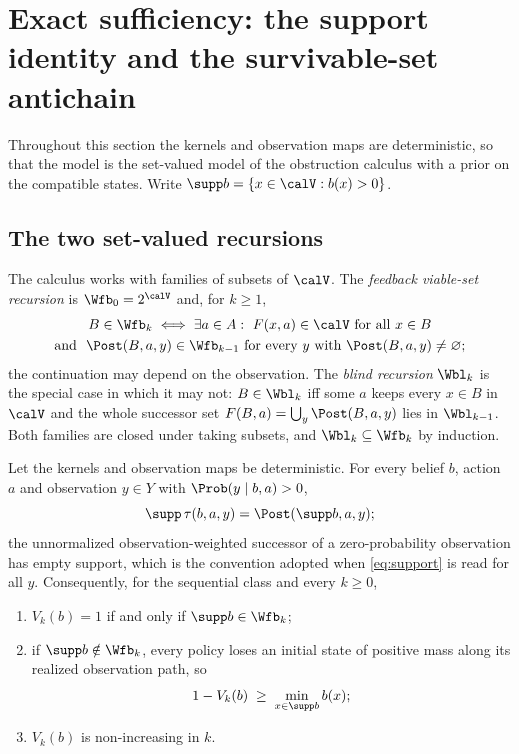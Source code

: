 \section{Exact sufficiency: the support identity and the survivable-set antichain}\label{sec:support}

Throughout this section the kernels and observation maps are deterministic, so that the model is the set-valued model of the obstruction calculus with a prior on the compatible states. Write $\supp b=\{x\in\calV:b(x)>0\}$.

\subsection{The two set-valued recursions}

The calculus works with families of subsets of $\calV$. The \emph{feedback viable-set recursion} is $\Wfb_0=2^{\calV}$ and, for $k\ge1$,
\begin{multline*}
B\in\Wfb_k\iff\exists a\in A:\ F(x,a)\in\calV\ \text{for all }x\in B\\ \text{and }\ \Post(B,a,y)\in\Wfb_{k-1}\ \text{for every }y\text{ with }\Post(B,a,y)\neq\varnothing ;
\end{multline*}
the continuation may depend on the observation. The \emph{blind recursion} $\Wbl_k$ is the special case in which it may not: $B\in\Wbl_k$ iff some $a$ keeps every $x\in B$ in $\calV$ and the whole successor set $F(B,a)=\bigcup_y\Post(B,a,y)$ lies in $\Wbl_{k-1}$. Both families are closed under taking subsets, and $\Wbl_k\subseteq\Wfb_k$ by induction.

\begin{theorem}\label{thm:support}
Let the kernels and observation maps be deterministic. For every belief $b$, action $a$ and observation $y\in Y$ with $\Prob(y\mid b,a)>0$,
\begin{equation}\label{eq:support}
\supp\,\tau(b,a,y)=\Post(\supp b,a,y);
\end{equation}
the unnormalized observation-weighted successor of a zero-probability observation has empty support, which is the convention adopted when \eqref{eq:support} is read for all $y$. Consequently, for the sequential class and every $k\ge0$,
\begin{enumerate}[leftmargin=1.6em,itemsep=1pt]
\item[(i)] $V_k(b)=1$ if and only if $\supp b\in\Wfb_k$;
\item[(ii)] if $\supp b\notin\Wfb_k$, every policy loses an initial state of positive mass along its realized observation path, so
\begin{equation}\label{eq:minmass}
1-V_k(b)\;\ge\;\min_{x\in\supp b}b(x);
\end{equation}
\item[(iii)] $V_k(b)$ is non-increasing in $k$.
\end{enumerate}
\end{theorem}

